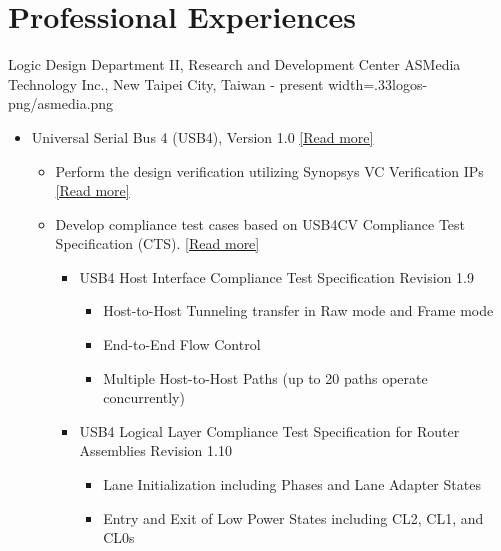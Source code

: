 \documentclass{cvclass}
\newcommand{\simplemmyy}[3]{\shortmmyyformat\formatdate{#3}{#2}{#1}}
\begin{document}
\makeinfo


\section{Professional Experiences}

    {Logic Design Department II, Research and Development Center}
    {ASMedia Technology Inc., New Taipei City, Taiwan}
    {\simplemmyy{2023}{7}{17} - present}
    {width=.33\linewidth}{logos-png/asmedia.png}
    {\begin{itemize}
        \item Universal Serial Bus 4 (USB4\textsuperscript{\tiny\textregistered}),  Version 1.0 \href{https://www.usb.org/usb4}{[Read more]}
        \begin{itemize}
            \item Perform the design verification utilizing Synopsys\textsuperscript{\tiny\textregistered} VC Verification IPs \href{https://www.synopsys.com/verification/verification-ip/subsystems/vc-verification-ip-usb4.html}{[Read more]}
            \item Develop compliance test cases based on USB4CV Compliance Test Specification (CTS). \href{https://www.usb.org/document-library/usb4cv-compliance-test-specification}{[Read more]}
            \begin{itemize}
                \item USB4\texttrademark{} Host Interface Compliance Test Specification Revision 1.9
                \begin{itemize}
                    \item Host-to-Host Tunneling transfer in Raw mode and Frame mode
                    \item End-to-End Flow Control
                    \item Multiple Host-to-Host Paths (up to 20 paths operate concurrently)
                \end{itemize}
                \item USB4\texttrademark{} Logical Layer Compliance Test Specification for Router Assemblies Revision 1.10
                \begin{itemize}
                    \item Lane Initialization including Phases and Lane Adapter States
                    \item Entry and Exit of Low Power States including CL2, CL1, and CL0s

\end{itemize}
\end{itemize}
\end{itemize}
\end{itemize}}
\end{document}
